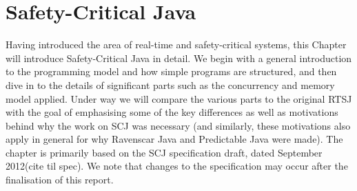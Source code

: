 \chapter{Safety-Critical Java}
\label{chapter:scj}
Having introduced the area of real-time and safety-critical systems, this Chapter will introduce Safety-Critical Java in detail. We begin with a general introduction to the programming model and how simple programs are structured, and then dive in to the details of significant parts such as the concurrency and memory model applied. Under way we will compare the various parts to the original RTSJ with the goal of emphasising some of the key differences as well as motivations behind why the work on SCJ was necessary (and similarly, these motivations also apply in general for why Ravenscar Java and Predictable Java were made). The chapter is primarily based on the SCJ specification draft, dated September 2012(cite til spec). We note that changes to the specification may occur after the finalisation of this report.